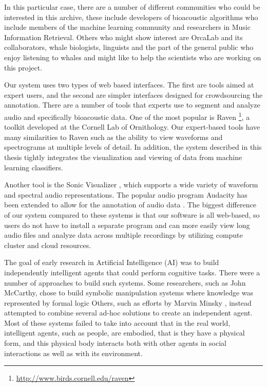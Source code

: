 \documentclass[12pt,oneside]{book}
\begin{document}
In this particular case, there are a number of different communities
who could be interested in this archive, these include developers of
bioacoustic algorithms who include members of the machine learning
community \cite{clark2012dcl} and researchers in Music Information
Retrieval.  Others who might show interest are OrcaLab and its
collaborators, whale biologists, linguists and the part of the general
public who enjoy listening to whales and might like to help the
scientists who are working on this project.

Our system uses two types of web based interfaces.  The first are
tools aimed at expert users, and the second are simpler interfaces
designed for crowdsourcing the annotation. There are a number of tools
that experts use to segment and analyze audio and specifically
bioacoustic data.  One of the most popular is Raven
\footnote{\url{http://www.birds.cornell.edu/raven}}, a toolkit
developed at the Cornell Lab of Ornithology.  Our expert-based tools
have many similarities to Raven such as the ability to view waveforms
and spectrograms at multiple levels of detail. In addition, the system
described in this thesis tightly integrates the visualization and
viewing of data from machine learning classifiers.

Another tool is the Sonic Visualizer \cite{cannam2010sonic}, which
supports a wide variety of waveform and spectral audio
representations. The popular audio program Audacity has been extended
to allow for the annotation of audio data \cite{li2006auacity}.  The
biggest difference of our system compared to these systems is that our
software is all web-based, so users do not have to install a separate
program and can more easily view long audio files and analyze data
across multiple recordings by utilizing compute cluster and cloud
resources.

The goal of early research in Artificial Intelligence (AI) was to
build independently intelligent agents that could perform cognitive
tasks.  There were a number of approaches to build such systems.  Some
researchers, such as John McCarthy, chose to build symbolic
manipulation systems where knowledge was represented by formal logic
\cite{mccarthy1968some} Others, such as efforts by Marvin Minsky
\cite{minsky1961steps}, instead attempted to combine several ad-hoc
solutions to create an independent agent.  Most of these systems
failed to take into account that in the real world, intelligent
agents, such as people, are embodied, that is they have a physical
form, and this physical body interacts both with other agents in
social interactions as well as with its environment.
\end{document}
